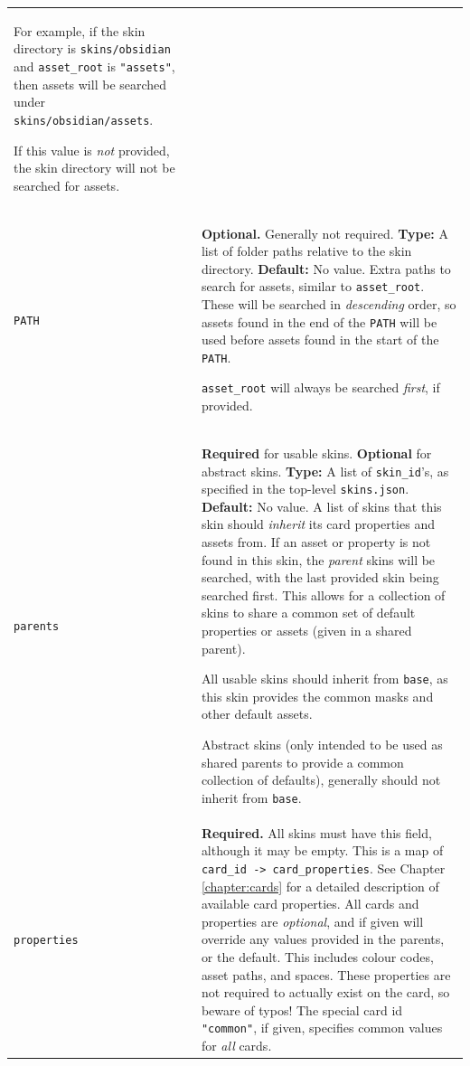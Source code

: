 \documentclass[a4paper, 10pt]{report}
\begin{document}
\begin{longtable}{| p{} p{} |}
  For example, if the skin directory is \texttt{skins/obsidian} and \texttt{asset\_root}
  is \texttt{"assets"}, then assets will be searched under \texttt{skins/obsidian/assets}.

  If this value is \emph{not} provided, the skin directory will not be searched for assets.
  \\
  \texttt{PATH} &
  \textbf{Optional.} Generally not required.\newline
  \textbf{Type:} A list of folder paths relative to the skin directory.\newline
  \textbf{Default:} No value.\newline
  Extra paths to search for assets, similar to \texttt{asset\_root}.
  These will be searched in \emph{descending} order, so assets found in the end of the \texttt{PATH}
  will be used before assets found in the start of the \texttt{PATH}.

  \texttt{asset\_root} will always be searched \emph{first}, if provided.
  \\
  \texttt{parents} &
  \textbf{Required} for usable skins. \textbf{Optional} for abstract skins. \newline
  \textbf{Type:} A list of \texttt{skin\_id}'s, as specified in the top-level \texttt{skins.json}. \newline
  \textbf{Default:} No value.\newline
  A list of skins that this skin should \emph{inherit} its card properties and assets from.
  If an asset or property is not found in this skin, the \emph{parent} skins will be searched,
  with the last provided skin being searched first.
  This allows for a collection of skins to share a common set of default properties or assets (given in a shared parent).

  All usable skins should inherit from \texttt{base}, as this skin provides the common masks and other default assets.

  Abstract skins (only intended to be used as shared parents to provide a common collection of defaults),
  generally should not inherit from \texttt{base}.
  \\
  \texttt{properties} &
  \textbf{Required.} All skins must have this field, although it may be empty.\newline
  This is a map of \texttt{card\_id -> card\_properties}.\newline
  See Chapter \ref{chapter:cards} for a detailed description of available card properties.\newline
  All cards and properties are \emph{optional}, and if given will override any values provided in the parents, or the default.
  This includes colour codes, asset paths, and spaces.
  These properties are not required to actually exist on the card, so beware of typos!\newline
  The special card id \texttt{"common"}, if given, specifies common values for \emph{all} cards.
  \\
  \hline
\end{longtable}
\end{document}
